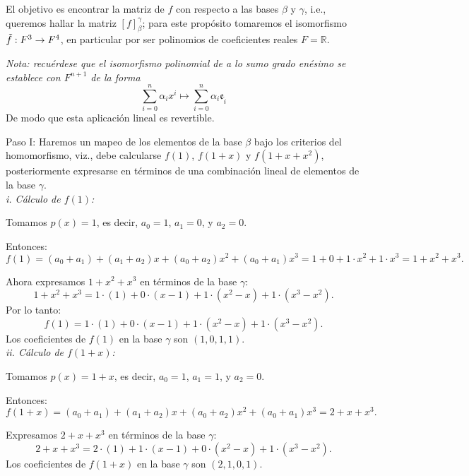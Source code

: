 \documentclass{article}
\begin{document}
El objetivo es encontrar la matriz de \( f \) con respecto a las bases \( \beta \) y \( \gamma \), i.e., queremos hallar la matriz \( [f]_\beta^\gamma \); para este propósito tomaremos el isomorfismo $\Tilde{f}:F^3 \rightarrow F^4$, en particular por ser polinomios de coeficientes reales $F=\mathbb{R}$.

\begin{mdframed}
    \textit{Nota: recuérdese que el isomorfismo polinomial de a lo sumo grado enésimo se establece con $F^{n+1}$ de la forma}
    \begin{equation}
        \sum_{i=0}^n \alpha_i x^i \longmapsto \sum_{i=0}^n \alpha_i \mathfrak{e}_{\hat{i}}
    \end{equation}
    De modo que esta aplicación lineal es revertible.
\end{mdframed}

Paso I: Haremos un mapeo de los elementos de la base $\beta$ bajo los criterios del homomorfismo, viz., debe calcularse \( f(1) \), \( f(1 + x) \) y \( f(1 + x + x^2) \), posteriormente expresarse en términos de una combinación lineal de elementos de la base \( \gamma \). \\

\noindent \textit{i. Cálculo de \( f(1) \):}

   Tomamos \( p(x) = 1 \), es decir, \( a_0 = 1 \), \( a_1 = 0 \), y \( a_2 = 0 \).

   Entonces:
   \[
   f(1) = (a_0 + a_1) + (a_1 + a_2)x + (a_0 + a_2)x^2 + (a_0 + a_1)x^3 = 1 + 0 + 1 \cdot x^2 + 1 \cdot x^3 = 1 + x^2 + x^3.
   \]

   Ahora expresamos \( 1 + x^2 + x^3 \) en términos de la base \( \gamma \):
   \[
   1 + x^2 + x^3 = 1 \cdot (1) + 0 \cdot (x - 1) + 1 \cdot (x^2 - x) + 1 \cdot (x^3 - x^2).
   \]
   Por lo tanto:
   \[
   f(1) = 1 \cdot (1) + 0 \cdot (x - 1) + 1 \cdot (x^2 - x) + 1 \cdot (x^3 - x^2).
   \]
   Los coeficientes de \( f(1) \) en la base \( \gamma \) son \( (1, 0, 1, 1) \). \\

\noindent \textit{ii. Cálculo de \( f(1 + x) \):}

   Tomamos \( p(x) = 1 + x \), es decir, \( a_0 = 1 \), \( a_1 = 1 \), y \( a_2 = 0 \).

   Entonces:
   \[
   f(1 + x) = (a_0 + a_1) + (a_1 + a_2)x + (a_0 + a_2)x^2 + (a_0 + a_1)x^3 = 2 + x + x^3.
   \]

   Expresamos \( 2 + x + x^3 \) en términos de la base \( \gamma \):
   \[
   2 + x + x^3 = 2 \cdot (1) + 1 \cdot (x - 1) + 0 \cdot (x^2 - x) + 1 \cdot (x^3 - x^2).
   \]
   Los coeficientes de \( f(1 + x) \) en la base \( \gamma \) son \( (2, 1, 0, 1) \). \\
\end{document}

